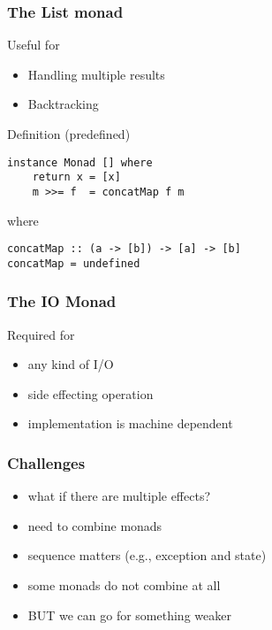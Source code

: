 \documentclass{beamer}
\begin{document}
\begin{frame}[fragile]
  \frametitle{The List monad}
  \begin{block}{Useful for}
                \begin{itemize}         
                        \item Handling multiple results
                        \item Backtracking
                \end{itemize}   
                \end{block}     
\pause
\begin{block}{Definition (predefined)}
\begin{lstlisting}
instance Monad [] where
    return x = [x]
    m >>= f  = concatMap f m
\end{lstlisting}  
\end{block}
where 
\begin{lstlisting}
concatMap :: (a -> [b]) -> [a] -> [b]
concatMap = undefined
\end{lstlisting}
\end{frame}             

\begin{frame}[fragile]
  \frametitle{The IO Monad}
  \begin{block}{Required for}
  \begin{itemize}
        \item any kind of I/O
        \item side effecting operation
        \item implementation is machine dependent
  \end{itemize}
  \end{block}
\end{frame}

\begin{frame}
  \frametitle{Challenges}
  \begin{itemize}[<+->]
  \item what if there are multiple effects?
  \item need to combine monads
  \item sequence matters (e.g., exception and state)
  \item some monads do not combine at all
  \item BUT we can go for something weaker
  \end{itemize}
  
\end{frame}
\end{document}
